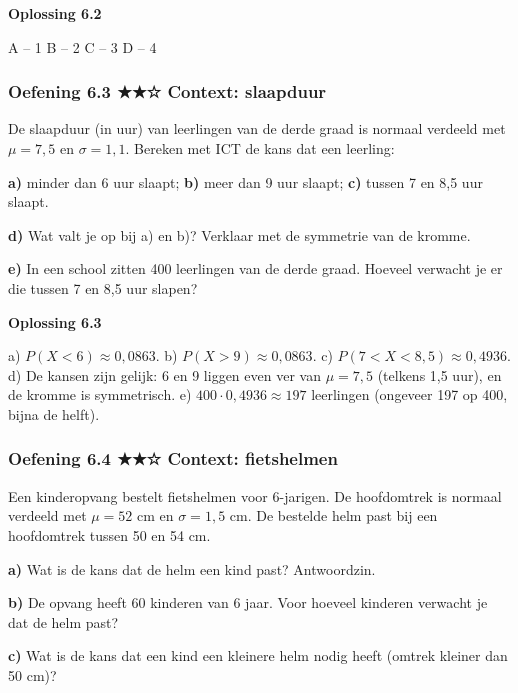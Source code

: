 \begin{oplossing}
\textbf{Oplossing 6.2}

A – 1 \quad B – 2 \quad C – 3 \quad D – 4
\end{oplossing}

\subsubsection*{Oefening 6.3 \quad ★★☆ \quad Context: slaapduur}

De slaapduur (in uur) van leerlingen van de derde graad is normaal verdeeld met $\mu=7{,}5$ en $\sigma=1{,}1$. Bereken met ICT de kans dat een leerling:

\textbf{a)} minder dan 6 uur slaapt; \quad \textbf{b)} meer dan 9 uur slaapt; \quad \textbf{c)} tussen 7 en 8,5 uur slaapt. \lijn

\textbf{d)} Wat valt je op bij a) en b)? Verklaar met de symmetrie van de kromme. \lijn

\textbf{e)} In een school zitten 400 leerlingen van de derde graad. Hoeveel verwacht je er die tussen 7 en 8,5 uur slapen? \lijn

\begin{oplossing}
\textbf{Oplossing 6.3}

a) $P(X<6)\approx 0{,}0863$. b) $P(X>9)\approx 0{,}0863$. c) $P(7<X<8{,}5)\approx 0{,}4936$. d) De kansen zijn gelijk: 6 en 9 liggen even ver van $\mu=7{,}5$ (telkens 1,5 uur), en de kromme is symmetrisch. e) $400\cdot 0{,}4936\approx 197$ leerlingen (ongeveer 197 op 400, bijna de helft).
\end{oplossing}

\subsubsection*{Oefening 6.4 \quad ★★☆ \quad Context: fietshelmen}

Een kinderopvang bestelt fietshelmen voor 6-jarigen. De hoofdomtrek is normaal verdeeld met $\mu=52$ cm en $\sigma=1{,}5$ cm. De bestelde helm past bij een hoofdomtrek tussen 50 en 54 cm.

\textbf{a)} Wat is de kans dat de helm een kind past? Antwoordzin. \lijn

\textbf{b)} De opvang heeft 60 kinderen van 6 jaar. Voor hoeveel kinderen verwacht je dat de helm past? \lijn

\textbf{c)} Wat is de kans dat een kind een kleinere helm nodig heeft (omtrek kleiner dan 50 cm)? \lijn

